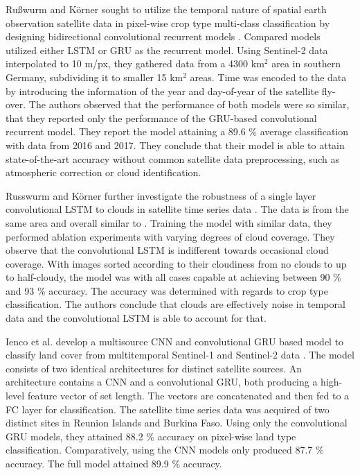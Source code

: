 Ru{\ss}wurm and K{\"{o}}rner sought to utilize the temporal nature of spatial earth observation satellite data in pixel-wise crop type multi-class classification by designing bidirectional convolutional recurrent models \cite{Russwurm2018}. Compared models utilized either LSTM or GRU as the recurrent model. Using Sentinel-2 data interpolated to 10 m/px, they gathered data from a 4300 km$^2$ area in southern Germany, subdividing it to smaller 15 km$^2$ areas. Time was encoded to the data by introducing the information of the year and day-of-year of the satellite fly-over. The authors observed that the performance of both models were so similar, that they reported only the performance of the GRU-based convolutional recurrent model. They report the model attaining a 89.6 \% average classification with data from 2016 and 2017. They conclude that their model is able to attain state-of-the-art accuracy without common satellite data preprocessing, such as atmospheric correction or cloud identification.

Russwurm and K{\"{o}}rner further investigate the robustness of a single layer convolutional LSTM to clouds in satellite time series data \cite{Russwurm2018b}. The data is from the same area and overall similar to \cite{Russwurm2018}. Training the model with similar data, they performed ablation experiments with varying degrees of cloud coverage. They observe that the convolutional LSTM is indifferent towards occasional cloud coverage. With images sorted according to their cloudiness from no clouds to up to half-cloudy, the model was with all cases capable at achieving between 90 \% and 93 \% accuracy. The accuracy was determined with regards to crop type classification. The authors conclude that clouds are effectively noise in temporal data and the convolutional LSTM is able to account for that.

Ienco et al. develop a multisource CNN and convolutional GRU based model to classify land cover from multitemporal Sentinel-1 and Sentinel-2 data \cite{Ienco2019}. The model consists of two identical architectures for distinct satellite sources. An architecture contains a CNN and a convolutional GRU, both producing a high-level feature vector of set length. The vectors are concatenated and then fed to a FC layer for classification. The satellite time series data was acquired of two distinct sites in Reunion Islands and Burkina Faso. Using only the convolutional GRU models, they attained 88.2 \% accuracy on pixel-wise land type classification. Comparatively, using the CNN models only produced 87.7 \% accuracy. The full model attained 89.9 \% accuracy. 

